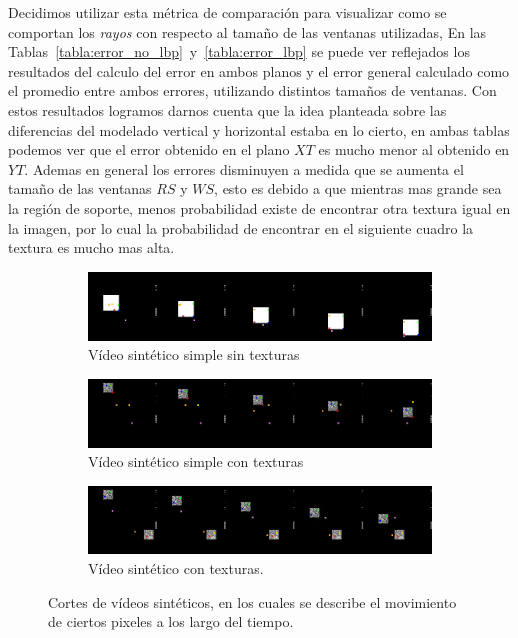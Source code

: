 Decidimos utilizar esta métrica de comparación para visualizar como se comportan los \textit{rayos} con respecto al tamaño de las ventanas utilizadas, En las Tablas~\ref{tabla:error_no_lbp}~y~\ref{tabla:error_lbp} se puede ver reflejados los resultados del calculo del error en ambos planos y el error general calculado como el promedio entre ambos errores, utilizando distintos tamaños de ventanas. Con estos resultados logramos darnos cuenta que la idea planteada sobre las diferencias del modelado vertical y horizontal estaba en lo cierto, en ambas tablas podemos ver que el error obtenido en el plano $XT$ es mucho menor al obtenido en $YT$. Ademas en general los errores disminuyen a medida que se aumenta el tamaño de las ventanas $RS$ y $WS$, esto es debido a que mientras mas grande sea la región de soporte, menos probabilidad existe de encontrar otra textura igual en la imagen, por lo cual la probabilidad de encontrar en el siguiente cuadro la textura es mucho mas alta.

\begin{figure}[t]
	\begin{subfigure}{1.0\textwidth}
		\centering
		\includegraphics[width=1\textwidth]{Figuras/resultados/videos_sinteticos/v1.png}
		\caption{Vídeo sintético simple sin texturas}
		\label{exp:fig:vs1}
	\end{subfigure}
	
	\begin{subfigure}{1.0\textwidth}
		\centering
		\includegraphics[width=1\textwidth]{Figuras/resultados/videos_sinteticos/v2.png}
		\caption{Vídeo sintético simple con texturas}
		\label{exp:fig:vs2}
	\end{subfigure}
	
	\begin{subfigure}{1.0\textwidth}
		\centering
		\includegraphics[width=1\textwidth]{Figuras/resultados/videos_sinteticos/v3.png}
		\caption{Vídeo sintético con texturas.}
		\label{exp:fig:vs3}
	\end{subfigure}
	\caption{Cortes de vídeos sintéticos, en los cuales se describe el movimiento de ciertos pixeles a los largo del tiempo.} 
	\label{exp:fig:vs}
\end{figure}


